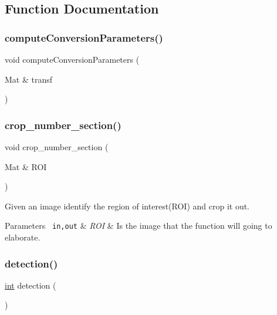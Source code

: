 \subsection{Function Documentation}
\mbox{\label{detection_8hh_a6dd0ff536f981bf8130318bce3c86e33}} 
\subsubsection{\texorpdfstring{computeConversionParameters()}{computeConversionParameters()}}
{\footnotesize\ttfamily void compute\+Conversion\+Parameters (\begin{DoxyParamCaption}\item[{Mat \&}]{transf }\end{DoxyParamCaption})}

\mbox{\label{detection_8hh_a8edaf0da54add7cd1461bafecef26b56}} 
\subsubsection{\texorpdfstring{crop\_number\_section()}{crop\_number\_section()}}
{\footnotesize\ttfamily void crop\+\_\+number\+\_\+section (\begin{DoxyParamCaption}\item[{Mat \&}]{R\+OI }\end{DoxyParamCaption})}



Given an image identify the region of interest(\+R\+O\+I) and crop it out. 


\begin{DoxyParams}[1]{Parameters}
\mbox{\texttt{ in,out}}  & {\em R\+OI} & Is the image that the function will going to elaborate. \\
\hline
\end{DoxyParams}
\mbox{\label{detection_8hh_a17e13c447692201697b084a1906cf6fb}} 
\subsubsection{\texorpdfstring{detection()}{detection()}}
{\footnotesize\ttfamily \mbox{\hyperlink{draw_8hh_aa620a13339ac3a1177c86edc549fda9b}{int}} detection (\begin{DoxyParamCaption}{ }\end{DoxyParamCaption})}



